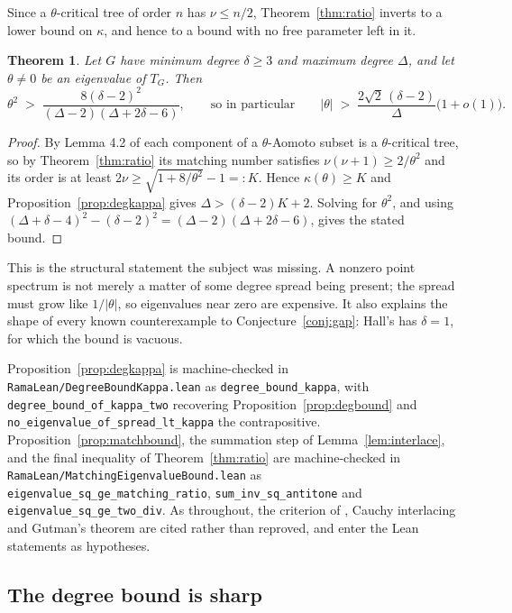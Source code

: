 \documentclass[11pt]{article}
\newtheorem{theorem}{Theorem}
\theoremstyle{remark}
\begin{document}
Since a $\theta$-critical tree of order $n$ has $\nu\le n/2$, Theorem~\ref{thm:ratio} inverts to a
lower bound on $\kappa$, and hence to a bound with no free parameter left in it.

\begin{theorem}\label{thm:main}
Let $G$ have minimum degree $\delta\ge3$ and maximum degree $\Delta$, and let $\theta\ne0$ be an
eigenvalue of $T_G$. Then
\[
  \theta^2\;>\;\frac{8(\delta-2)^2}{(\Delta-2)(\Delta+2\delta-6)},
  \qquad\text{so in particular}\qquad
  |\theta|\;>\;\frac{2\sqrt2\,(\delta-2)}{\Delta}\bigl(1+o(1)\bigr).
\]
\end{theorem}

\begin{proof}
By Lemma 4.2 of \cite{BGM} each component of a $\theta$-Aomoto subset is a $\theta$-critical tree,
so by Theorem~\ref{thm:ratio} its matching number satisfies $\nu(\nu+1)\ge2/\theta^2$ and its order
is at least $2\nu\ge\sqrt{1+8/\theta^2}-1=:K$. Hence $\kappa(\theta)\ge K$ and
Proposition~\ref{prop:degkappa} gives $\Delta>(\delta-2)K+2$. Solving for $\theta^2$, and using
$(\Delta+\delta-4)^2-(\delta-2)^2=(\Delta-2)(\Delta+2\delta-6)$, gives the stated bound.
\end{proof}

This is the structural statement the subject was missing. A nonzero point spectrum is not merely a
matter of some degree spread being present; the spread must grow like $1/|\theta|$, so eigenvalues
near zero are expensive. It also explains the shape of every known counterexample to
Conjecture~\ref{conj:gap}: Hall's has $\delta=1$, for which the bound is vacuous.

Proposition~\ref{prop:degkappa} is machine-checked in \texttt{RamaLean/DegreeBoundKappa.lean} as
\texttt{degree\_bound\_kappa}, with \texttt{degree\_bound\_of\_kappa\_two} recovering
Proposition~\ref{prop:degbound} and \texttt{no\_eigenvalue\_of\_spread\_lt\_kappa} the
contrapositive. Proposition~\ref{prop:matchbound}, the summation step of
Lemma~\ref{lem:interlace}, and the final inequality of Theorem~\ref{thm:ratio} are machine-checked
in \texttt{RamaLean/MatchingEigenvalueBound.lean} as
\texttt{eigenvalue\_sq\_ge\_matching\_ratio}, \texttt{sum\_inv\_sq\_antitone} and
\texttt{eigenvalue\_sq\_ge\_two\_div}. As throughout, the criterion of \cite{BGM}, Cauchy
interlacing and Gutman's theorem are cited rather than reproved, and enter the Lean statements as
hypotheses.

\subsection{The degree bound is sharp}\label{sec:sharp}
\end{document}
